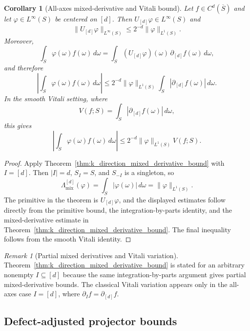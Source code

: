 \documentclass[11pt,letterpaper]{article}
\newtheorem{corollary}[theorem]{Corollary}
\theoremstyle{definition}
\theoremstyle{remark}
\newtheorem{remark}[theorem]{Remark}
\begin{document}
\begin{corollary}[All-axes mixed-derivative and Vitali bound]
\label{cor:all_axes_vitali_bound}
Let $f\in C^d(\overline S)$ and let $\varphi\in L^\infty(S)$ be centered on
$[d]$. Then $U_{[d]}\varphi\in L^\infty(S)$ and
$$
\|U_{[d]}\varphi\|_{L^\infty(S)}
\le
2^{-d}\|\varphi\|_{L^1(S)}.
$$
Moreover,
$$
\int_S\varphi(\omega)f(\omega)\,d\omega
=
\int_S
(U_{[d]}\varphi)(\omega)\,\partial_{[d]}f(\omega)\,d\omega,
$$
and therefore
$$
\left|
\int_S\varphi(\omega)f(\omega)\,d\omega
\right|
\le
2^{-d}\|\varphi\|_{L^1(S)}
\int_S|\partial_{[d]}f(\omega)|\,d\omega.
$$
In the smooth Vitali setting, where
$$
V(f;S)=\int_S|\partial_{[d]}f(\omega)|\,d\omega,
$$
this gives
\begin{equation}
\label{eq:all_axes_vitali_bound}
\left|
\int_S\varphi(\omega)f(\omega)\,d\omega
\right|
\le
2^{-d}\|\varphi\|_{L^1(S)}V(f;S).
\end{equation}
\end{corollary}

\begin{proof}
Apply Theorem~\ref{thm:k_direction_mixed_derivative_bound} with $I=[d]$.
Then $|I|=d$, $S_I=S$, and $S_{-I}$ is a singleton, so
$$
\Lambda_{\mathrm{mix}}^{[d]}(\varphi)
=
\int_S|\varphi(\omega)|\,d\omega
=
\|\varphi\|_{L^1(S)}.
$$
The primitive in the theorem is $U_{[d]}\varphi$, and the displayed estimates
follow directly from the primitive bound, the integration-by-parts identity,
and the mixed-derivative estimate in Theorem~\ref{thm:k_direction_mixed_derivative_bound}.
The final inequality follows from the smooth Vitali identity.
\end{proof}

\begin{remark}[Partial mixed derivatives and Vitali variation]
\label{rem:partial_mixed_and_vitali_bound}
Theorem~\ref{thm:k_direction_mixed_derivative_bound} is stated for an arbitrary
nonempty $I\subseteq[d]$ because the same integration-by-parts argument gives
partial mixed-derivative bounds. The classical Vitali variation appears only
in the all-axes case $I=[d]$, where $\partial_I f=\partial_{[d]}f$.
\end{remark}




\subsection{Defect-adjusted projector bounds } 
\label{subsec:defect_adjusted_projector_bounds}
\end{document}
